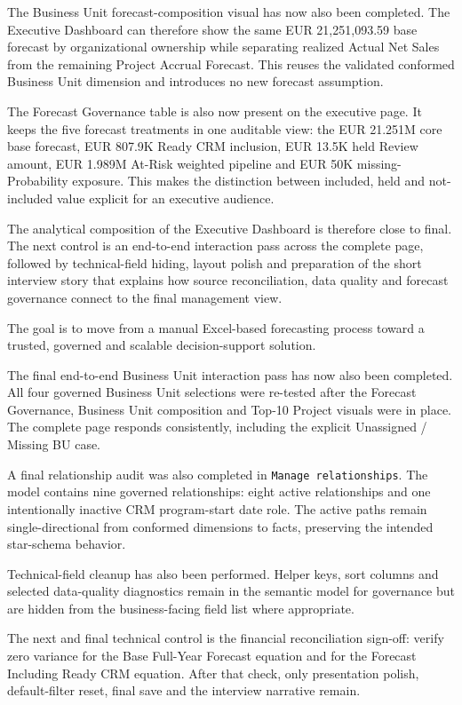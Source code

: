 \documentclass[11pt,a4paper]{article}
\begin{document}
\begin{summarybox}
The Business Unit forecast-composition visual has now also been completed. The
Executive Dashboard can therefore show the same EUR 21,251,093.59 base forecast
by organizational ownership while separating realized Actual Net Sales from the
remaining Project Accrual Forecast. This reuses the validated conformed Business
Unit dimension and introduces no new forecast assumption.

The Forecast Governance table is also now present on the executive page. It keeps
the five forecast treatments in one auditable view: the EUR 21.251M core base
forecast, EUR 807.9K Ready CRM inclusion, EUR 13.5K held Review amount,
EUR 1.989M At-Risk weighted pipeline and EUR 50K missing-Probability exposure.
This makes the distinction between included, held and not-included value explicit
for an executive audience.

The analytical composition of the Executive Dashboard is therefore close to final.
The next control is an end-to-end interaction pass across the complete page, followed
by technical-field hiding, layout polish and preparation of the short interview
story that explains how source reconciliation, data quality and forecast governance
connect to the final management view.

The goal is to move from a manual Excel-based forecasting process toward
a trusted, governed and scalable decision-support solution.



The final end-to-end Business Unit interaction pass has now also been completed.
All four governed Business Unit selections were re-tested after the Forecast Governance,
Business Unit composition and Top-10 Project visuals were in place. The complete page
responds consistently, including the explicit Unassigned / Missing BU case.

A final relationship audit was also completed in \texttt{Manage relationships}. The
model contains nine governed relationships: eight active relationships and one
intentionally inactive CRM program-start date role. The active paths remain
single-directional from conformed dimensions to facts, preserving the intended
star-schema behavior.

Technical-field cleanup has also been performed. Helper keys, sort columns and selected
data-quality diagnostics remain in the semantic model for governance but are hidden from
the business-facing field list where appropriate.

The next and final technical control is the financial reconciliation sign-off: verify zero
variance for the Base Full-Year Forecast equation and for the Forecast Including Ready CRM
equation. After that check, only presentation polish, default-filter reset, final save and
the interview narrative remain.

\end{summarybox}
\end{document}
